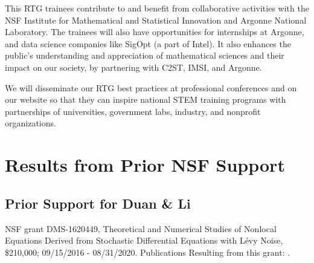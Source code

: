 \documentclass[11pt]{NSFamsart}
\begin{document}
This RTG trainees contribute to and benefit from collaborative activities with the NSF Institute for Mathematical and Statistical Innovation  and Argonne National Laboratory. The trainees will also have opportunities for internships at Argonne, and data science companies like SigOpt (a part of Intel). It also enhances the public’s understanding and appreciation of mathematical sciences and their impact on our society, by partnering with C2ST, IMSI, and Argonne. 
 
We will disseminate our RTG best practices at professional conferences and on our website so that they can inspire national STEM  training programs with partnerships of universities, government labs, industry, and nonprofit organizations.

 
\section{Results from Prior NSF Support}

 
  
 
\subsection*{Prior Support for Duan \& Li} NSF grant  DMS-1620449, Theoretical and Numerical Studies of Nonlocal Equations Derived from Stochastic Differential Equations with L\'evy Noise, \$210,000; 09/15/2016 - 08/31/2020. Publications Resulting from this grant:
 \cite{ChenWu, ChenXL2020,  DannyTesfay,GaoTing2016, Gao2016,    Liu2019LvyNI, Lv2016OnAS, QiaoDuan2018,Wang2018NumericalAF, YangDuanWiggins2020,ZhangZhuanDuan,ZhengDuan2017,ZhengYY2020}.

 
\end{document}
